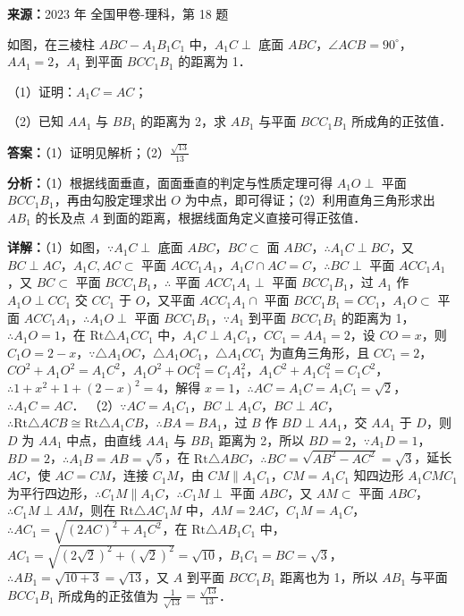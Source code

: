 \begin{question}[points=12]
\textbf{来源：}2023 年 全国甲卷-理科，第 18 题\par
如图，在三棱柱 $ABC-A_1B_1C_1$ 中，$A_1C \perp$ 底面 $ABC$，$\angle ACB = 90^\circ$，$AA_1 = 2$，$A_1$ 到平面 $BCC_1B_1$ 的距离为 1．

（1）证明：$A_1C = AC$；

（2）已知 $AA_1$ 与 $BB_1$ 的距离为 2，求 $AB_1$ 与平面 $BCC_1B_1$ 所成角的正弦值．
\begin{solution}
\textbf{答案：}（1）证明见解析；（2）$\frac{\sqrt{13}}{13}$

\textbf{分析：}（1）根据线面垂直，面面垂直的判定与性质定理可得 $A_1O \perp$ 平面 $BCC_1B_1$，再由勾股定理求出 $O$ 为中点，即可得证；（2）利用直角三角形求出 $AB_1$ 的长及点 $A$ 到面的距离，根据线面角定义直接可得正弦值．

\textbf{详解：}（1）如图，$\because A_1C \perp$ 底面 $ABC$，$BC \subset$ 面 $ABC$，$\therefore A_1C \perp BC$，又 $BC \perp AC$，$A_1C, AC \subset$ 平面 $ACC_1A_1$，$A_1C \cap AC = C$，$\therefore BC \perp$ 平面 $ACC_1A_1$，又 $BC \subset$ 平面 $BCC_1B_1$，$\therefore$ 平面 $ACC_1A_1 \perp$ 平面 $BCC_1B_1$，过 $A_1$ 作 $A_1O \perp CC_1$ 交 $CC_1$ 于 $O$，又平面 $ACC_1A_1 \cap$ 平面 $BCC_1B_1 = CC_1$，$A_1O \subset$ 平面 $ACC_1A_1$，$\therefore A_1O \perp$ 平面 $BCC_1B_1$，$\because A_1$ 到平面 $BCC_1B_1$ 的距离为 1，$\therefore A_1O = 1$，在 $\mathrm{Rt}\triangle A_1CC_1$ 中，$A_1C \perp A_1C_1$，$CC_1 = AA_1 = 2$，设 $CO = x$，则 $C_1O = 2-x$，$\because \triangle A_1OC$，$\triangle A_1OC_1$，$\triangle A_1CC_1$ 为直角三角形，且 $CC_1=2$，$CO^2+A_1O^2 = A_1C^2$，$A_1O^2+OC_1^2 = C_1A_1^2$，$A_1C^2+A_1C_1^2 = C_1C^2$，$\therefore 1+x^2+1+(2-x)^2 = 4$，解得 $x=1$，$\therefore AC = A_1C = A_1C_1 = \sqrt{2}$，$\therefore A_1C = AC$．
（2）$\because AC = A_1C_1$，$BC \perp A_1C$，$BC \perp AC$，$\therefore \mathrm{Rt}\triangle ACB \cong \mathrm{Rt}\triangle A_1CB$，$\therefore BA = BA_1$，过 $B$ 作 $BD \perp AA_1$，交 $AA_1$ 于 $D$，则 $D$ 为 $AA_1$ 中点，由直线 $AA_1$ 与 $BB_1$ 距离为 2，所以 $BD=2$，$\because A_1D=1$，$BD=2$，$\therefore A_1B = AB = \sqrt{5}$，在 $\mathrm{Rt}\triangle ABC$，$\therefore BC = \sqrt{AB^2-AC^2} = \sqrt{3}$，延长 $AC$，使 $AC=CM$，连接 $C_1M$，由 $CM \parallel A_1C_1$，$CM = A_1C_1$ 知四边形 $A_1CMC_1$ 为平行四边形，$\therefore C_1M \parallel A_1C$，$\therefore C_1M \perp$ 平面 $ABC$，又 $AM \subset$ 平面 $ABC$，$\therefore C_1M \perp AM$，则在 $\mathrm{Rt}\triangle AC_1M$ 中，$AM = 2AC$，$C_1M = A_1C$，$\therefore AC_1 = \sqrt{(2AC)^2+A_1C^2}$，在 $\mathrm{Rt}\triangle AB_1C_1$ 中，$AC_1 = \sqrt{(2\sqrt{2})^2+(\sqrt{2})^2} = \sqrt{10}$，$B_1C_1 = BC = \sqrt{3}$，$\therefore AB_1 = \sqrt{10+3} = \sqrt{13}$，又 $A$ 到平面 $BCC_1B_1$ 距离也为 1，所以 $AB_1$ 与平面 $BCC_1B_1$ 所成角的正弦值为 $\frac{1}{\sqrt{13}} = \frac{\sqrt{13}}{13}$．
\end{solution}
\end{question}

